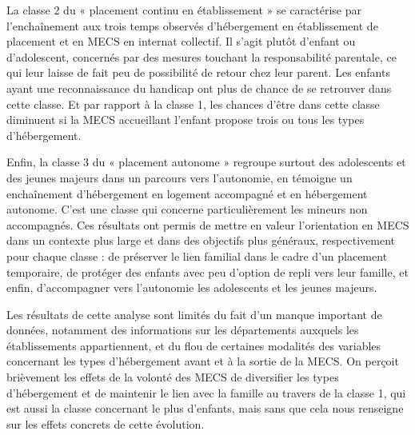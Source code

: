 \documentclass[
  12,
  a4paper,
]{report}
\begin{document}
La classe 2 du « placement continu en établissement » se caractérise par
l'enchaînement aux trois temps observés d'hébergement en établissement
de placement et en MECS en internat collectif. Il s'agit plutôt d'enfant
ou d'adolescent, concernés par des mesures touchant la responsabilité
parentale, ce qui leur laisse de fait peu de possibilité de retour chez
leur parent. Les enfants ayant une reconnaissance du handicap ont plus
de chance de se retrouver dans cette classe. Et par rapport à la classe
1, les chances d'être dans cette classe diminuent si la MECS accueillant
l'enfant propose trois ou tous les types d'hébergement.

Enfin, la classe 3 du « placement autonome » regroupe surtout des
adolescents et des jeunes majeurs dans un parcours vers l'autonomie, en
témoigne un enchaînement d'hébergement en logement accompagné et en
hébergement autonome. C'est une classe qui concerne particulièrement les
mineurs non accompagnés. Ces résultats ont permis de mettre en valeur
l'orientation en MECS dans un contexte plus large et dans des objectifs
plus généraux, respectivement pour chaque classe : de préserver le lien
familial dans le cadre d'un placement temporaire, de protéger des
enfants avec peu d'option de repli vers leur famille, et enfin,
d'accompagner vers l'autonomie les adolescents et les jeunes majeurs.

Les résultats de cette analyse sont limités du fait d'un manque
important de données, notamment des informations sur les départements
auxquels les établissements appartiennent, et du flou de certaines
modalités des variables concernant les types d'hébergement avant et à la
sortie de la MECS. On perçoit brièvement les effets de la volonté des
MECS de diversifier les types d'hébergement et de maintenir le lien avec
la famille au travers de la classe 1, qui est aussi la classe concernant
le plus d'enfants, mais sans que cela nous renseigne sur les effets
concrets de cette évolution.
\end{document}
